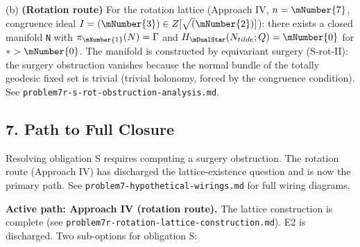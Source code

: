 (b) \textbf{(Rotation route)} For the rotation lattice (Approach IV, \(n = \mNumber{7}\),
congruence ideal \(I = (\mNumber{3}) \in Z[\sqrt(\mNumber{2})]\)): there exists a closed
manifold \texttt{N} with \(\pi_\mNumber{1}(N) = \Gamma\) and \(H_{\mDualStar}(N_{tilde}; Q) = \mNumber{0}\) for
\(* > \mNumber{0}\). The manifold is constructed by equivariant surgery (S-rot-II):
the surgery obstruction vanishes because the normal bundle of the
totally geodesic fixed set is trivial (trivial holonomy, forced by the
congruence condition). See \texttt{problem7r-s-rot-obstruction-analysis.md}.

\hypertarget{7-path-to-full-closure}{%
\subsection{7. Path to Full Closure}\label{7-path-to-full-closure}}

Resolving obligation S requires computing a surgery obstruction. The
rotation route (Approach IV) has discharged the lattice-existence question
and is now the primary path. See \texttt{problem7-hypothetical-wirings.md} for
full wiring diagrams.

\textbf{Active path: Approach IV (rotation route).} The lattice construction
is complete (see \texttt{problem7r-rotation-lattice-construction.md}). E2 is
discharged. Two sub-options for obligation S:

